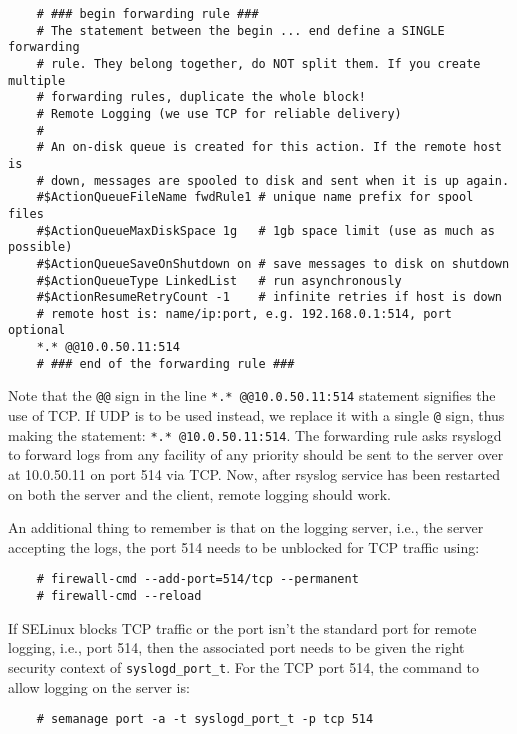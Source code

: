 	\vspace{-15pt}
	\begin{verbatim}
	# ### begin forwarding rule ###
	# The statement between the begin ... end define a SINGLE forwarding
	# rule. They belong together, do NOT split them. If you create multiple
	# forwarding rules, duplicate the whole block!
	# Remote Logging (we use TCP for reliable delivery)
	#
	# An on-disk queue is created for this action. If the remote host is
	# down, messages are spooled to disk and sent when it is up again.
	#$ActionQueueFileName fwdRule1 # unique name prefix for spool files
	#$ActionQueueMaxDiskSpace 1g   # 1gb space limit (use as much as possible)
	#$ActionQueueSaveOnShutdown on # save messages to disk on shutdown
	#$ActionQueueType LinkedList   # run asynchronously
	#$ActionResumeRetryCount -1    # infinite retries if host is down
	# remote host is: name/ip:port, e.g. 192.168.0.1:514, port optional
	*.* @@10.0.50.11:514
	# ### end of the forwarding rule ###
	\end{verbatim}
	\vspace{-10pt}	
	
	\noindent
	Note that the \verb|@@| sign in the line \verb|*.* @@10.0.50.11:514| statement signifies the use of TCP. If UDP is to be used instead, we replace it with a single \verb|@| sign, thus making the statement: \verb|*.* @10.0.50.11:514|. The forwarding rule asks rsyslogd to forward logs from any facility of any priority should be sent to the server over at 10.0.50.11 on port 514 via TCP. Now, after rsyslog service has been restarted on both the server and the client, remote logging should work. 
	
	An additional thing to remember is that on the logging server, i.e., the server accepting the logs, the port 514 needs to be unblocked for TCP traffic using:
	
	\vspace{-15pt}
	\begin{verbatim}
	# firewall-cmd --add-port=514/tcp --permanent
	# firewall-cmd --reload
	\end{verbatim}
	\vspace{-10pt}	
	
	\noindent
	If SELinux blocks TCP traffic or the port isn't the standard port for remote logging, i.e., port 514, then the associated port needs to be given the right security context of \verb|syslogd_port_t|. For the TCP port 514, the command to allow logging on the server is:
	
	\vspace{-15pt}
	\begin{verbatim}
	# semanage port -a -t syslogd_port_t -p tcp 514
	\end{verbatim}
	\vspace{-10pt}		
	



